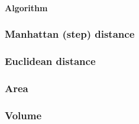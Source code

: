\paragraph{Algorithm}
\subsubsection{Manhattan (step) distance}
\subsubsection{Euclidean distance}
\subsubsection{Area}
\subsubsection{Volume}



